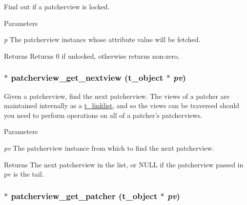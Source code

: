 Find out if a patcherview is locked. 
\begin{DoxyParams}{Parameters}
\item[{\em p}]The patcherview instance whose attribute value will be fetched. \end{DoxyParams}
\begin{DoxyReturn}{Returns}
Returns 0 if unlocked, otherwise returns non-\/zero. 
\end{DoxyReturn}
\hypertarget{group__jpatcherview_ga37810ea052b4ecd3598cd687666c8841}{
\subsubsection[{patcherview\_\-get\_\-nextview}]{$\ast$ patcherview\_\-get\_\-nextview ({\bf t\_\-object} $\ast$ {\em pv})}}
\label{group__jpatcherview_ga37810ea052b4ecd3598cd687666c8841}


Given a patcherview, find the next patcherview. The views of a patcher are maintained internally as a \hyperlink{structt__linklist}{t\_\-linklist}, and so the views can be traversed should you need to perform operations on all of a patcher's patcherviews.


\begin{DoxyParams}{Parameters}
\item[{\em pv}]The patcherview instance from which to find the next patcherview. \end{DoxyParams}
\begin{DoxyReturn}{Returns}
The next patcherview in the list, or NULL if the patcherview passed in pv is the tail. 
\end{DoxyReturn}
\hypertarget{group__jpatcherview_ga056a0684b79a940b8ee71145d9f77223}{
\subsubsection[{patcherview\_\-get\_\-patcher}]{$\ast$ patcherview\_\-get\_\-patcher ({\bf t\_\-object} $\ast$ {\em pv})}}
\label{group__jpatcherview_ga056a0684b79a940b8ee71145d9f77223}


